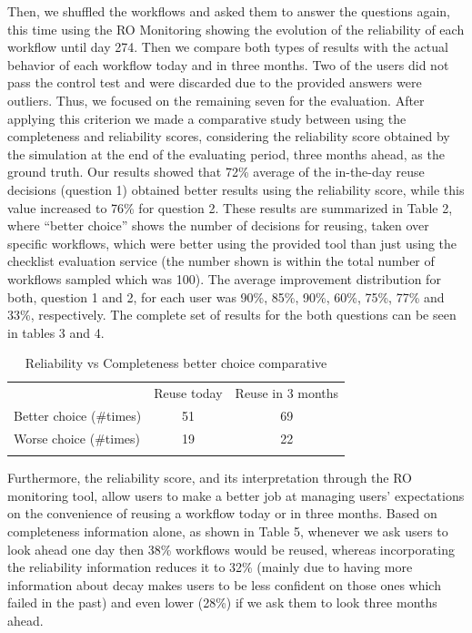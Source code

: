 Then, we shuffled the workflows and asked them to answer the questions
again, this time using the RO Monitoring showing the evolution of the
reliability of each workflow until day 274. Then we compare both types
of results with the actual behavior of each workflow today and in three
months. Two of the users did not pass the control test and were
discarded due to the provided answers were outliers. Thus, we focused on
the remaining seven for the evaluation. After applying this criterion we
made a comparative study between using the completeness and reliability
scores, considering the reliability score obtained by the simulation at
the end of the evaluating period, three months ahead, as the ground
truth. Our results showed that 72\% average of the in-the-day reuse
decisions (question 1) obtained better results using the reliability
score, while this value increased to 76\% for question 2. These results
are summarized in Table 2, where ``better choice'' shows the number of
decisions for reusing, taken over specific workflows, which were better
using the provided tool than just using the checklist evaluation service
(the number shown is within the total number of workflows sampled which
was 100). The average improvement distribution for both, question 1 and
2, for each user was 90\%, 85\%, 90\%, 60\%, 75\%, 77\% and 33\%,
respectively. The complete set of results for the both questions can be
seen in tables 3 and 4.

\begin{longtable}[c]{@{}lcc@{}}
\hline\noalign{\medskip}
& Reuse today & Reuse in 3 months
\\\noalign{\medskip}
\hline\noalign{\medskip}
Better choice (\#times) & 51 & 69
\\\noalign{\medskip}
Worse choice (\#times) & 19 & 22
\\\noalign{\medskip}
\hline
\caption{Reliability vs Completeness better choice comparative}
\end{longtable}

Furthermore, the reliability score, and its interpretation through the
RO monitoring tool, allow users to make a better job at managing users'
expectations on the convenience of reusing a workflow today or in three
months. Based on completeness information alone, as shown in Table 5,
whenever we ask users to look ahead one day then 38\% workflows would be
reused, whereas incorporating the reliability information reduces it to
32\% (mainly due to having more information about decay makes users to
be less confident on those ones which failed in the past) and even lower
(28\%) if we ask them to look three months ahead.

